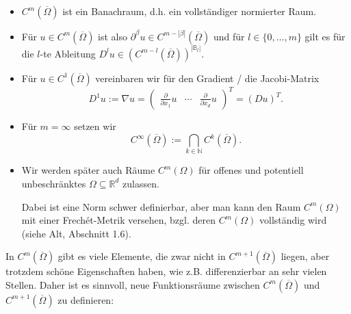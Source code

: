 \documentclass{book}
\newcommand{\assign}{:=}
\newcommand{\tmdummy}{$\mbox{}$}
\newenvironment{itemizedot}{\begin{itemize} \renewcommand{\labelitemi}{$\bullet$}\renewcommand{\labelitemii}{$\bullet$}\renewcommand{\labelitemiii}{$\bullet$}\renewcommand{\labelitemiv}{$\bullet$}}{\end{itemize}}
\begin{document}
\begin{remark*}
  {\tmdummy}
  
  \begin{itemizedot}
    \item $C^m \left( \overline{\Omega} \right)$ ist ein Banachraum, d.h. ein
    vollst{\"a}ndiger normierter Raum.
    
    \item F{\"u}r $u \in C^m \left( \overline{\Omega} \right)$ ist also
    $\partial^{\beta} u \in C^{m - | \beta |} \left( \overline{\Omega}
    \right)$ und f{\"u}r $l \in \{ 0, \ldots, m \}$ gilt es f{\"u}r die $l$-te
    Ableitung $D^l u \in \left( C^{m - l} \left( \overline{\Omega} \right)
    \right)^{| \mathbb{B}_l |}$.
    
    \item F{\"u}r $u \in C^1 \left( \overline{\Omega} \right)$ vereinbaren wir
    f{\"u}r den Gradient / die Jacobi-Matrix
    \[ D^1 u \assign \nabla u = \left(\begin{array}{ccc}
         \frac{\partial}{\partial x_1} u & \cdots & \frac{\partial}{\partial
         x_d} u
       \end{array}\right)^T = (D u)^T . \]
    \item F{\"u}r $m = \infty$ setzen wir
    \[ C^{\infty} \left( \overline{\Omega} \right) \assign \bigcap_{k \in
       \mathbb{N}} C^k \left( \overline{\Omega} \right) . \]
    \item Wir werden sp{\"a}ter auch R{\"a}ume $C^m (\Omega)$ f{\"u}r offenes
    und potentiell unbeschr{\"a}nktes $\Omega \subseteq \mathbb{R}^d$
    zulassen.
    
    Dabei ist eine Norm schwer definierbar, aber man kann den Raum $C^m
    (\Omega)$ mit einer Frech{\'e}t-Metrik versehen, bzgl. deren $C^m
    (\Omega)$ vollst{\"a}ndig wird (siehe Alt, Abschnitt 1.6). 
  \end{itemizedot}
\end{remark*}

In $C^m \left( \overline{\Omega} \right)$ gibt es viele Elemente, die zwar
nicht in $C^{m + 1} \left( \overline{\Omega} \right)$ liegen, aber trotzdem
sch{\"o}ne Eigenschaften haben, wie z.B. differenzierbar an sehr vielen
Stellen. Daher ist es sinnvoll, neue Funktionsr{\"a}ume zwischen $C^m \left(
\overline{\Omega} \right)$ und $C^{m + 1} \left( \overline{\Omega} \right)$ zu
definieren:
\end{document}
